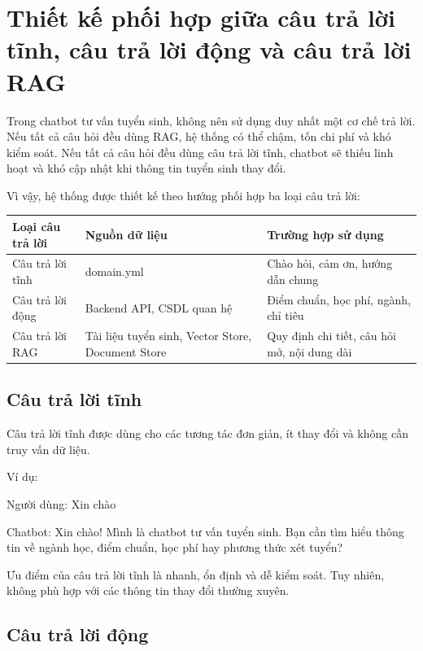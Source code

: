 ﻿\section{Thiết kế phối hợp giữa câu trả lời tĩnh, câu trả lời động và câu trả lời RAG}

Trong chatbot tư vấn tuyển sinh, không nên sử dụng duy nhất một cơ chế trả lời. Nếu tất cả câu hỏi đều dùng RAG, hệ thống có thể chậm, tốn chi phí và khó kiểm soát. Nếu tất cả câu hỏi đều dùng câu trả lời tĩnh, chatbot sẽ thiếu linh hoạt và khó cập nhật khi thông tin tuyển sinh thay đổi.

Vì vậy, hệ thống được thiết kế theo hướng phối hợp ba loại câu trả lời:

\begin{table}[H]
\centering
\begin{tabular}{|l|l|p{5cm}|}
\hline
\textbf{Loại câu trả lời} & \textbf{Nguồn dữ liệu} & \textbf{Trường hợp sử dụng} \\
\hline
Câu trả lời tĩnh & domain.yml & Chào hỏi, cảm ơn, hướng dẫn chung \\
\hline
Câu trả lời động & Backend API, CSDL quan hệ & Điểm chuẩn, học phí, ngành, chỉ tiêu \\
\hline
Câu trả lời RAG & Tài liệu tuyển sinh, Vector Store, Document Store & Quy định chi tiết, câu hỏi mở, nội dung dài \\
\hline
\end{tabular}
\end{table}

\subsection*{Câu trả lời tĩnh}

Câu trả lời tĩnh được dùng cho các tương tác đơn giản, ít thay đổi và không cần truy vấn dữ liệu.

Ví dụ:

Người dùng: Xin chào

Chatbot: Xin chào! Mình là chatbot tư vấn tuyển sinh. Bạn cần tìm hiểu thông tin về ngành học, điểm chuẩn, học phí hay phương thức xét tuyển?

Ưu điểm của câu trả lời tĩnh là nhanh, ổn định và dễ kiểm soát. Tuy nhiên, không phù hợp với các thông tin thay đổi thường xuyên.

\subsection*{Câu trả lời động}

